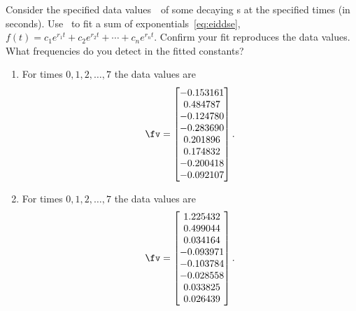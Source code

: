 \begin{reduce}
\begin{exercise}
\begin{enumerate}
\end{enumerate}
\end{exercise}



\begin{exercise}  
Consider the specified data values~\fv\ of some decaying s at the specified times (in seconds).
Use \script\ to fit a sum of exponentials~\eqref{eq:eiddse}, \(f(t)=c_1e^{r_1t}+c_2e^{r_2t}+\cdots+c_ne^{r_nt}\).
Confirm your fit reproduces the data values.
What frequencies do you detect in the fitted constants?
\begin{enumerate}
\item  For times \(0,1,2,\ldots,7\) the data values are 
\setbox\ajrqrbox\hbox{}\marginajrbox%
\[ \fv=\begin{bmatrix} -0.153161
\\  0.484787
\\ -0.124780
\\ -0.283690
\\  0.201896
\\  0.174832
\\ -0.200418
\\ -0.092107 \end{bmatrix}.\]
  
\item  For times \(0,1,2,\ldots,7\) the data values are 
\setbox\ajrqrbox\hbox{}\marginajrbox%
\[ \fv=\begin{bmatrix} 1.225432
\\  0.499044
\\  0.034164
\\ -0.093971
\\ -0.103784
\\ -0.028558
\\  0.033825
\\  0.026439 \end{bmatrix}.\]
  

\end{enumerate}
\end{exercise}
\end{reduce}
